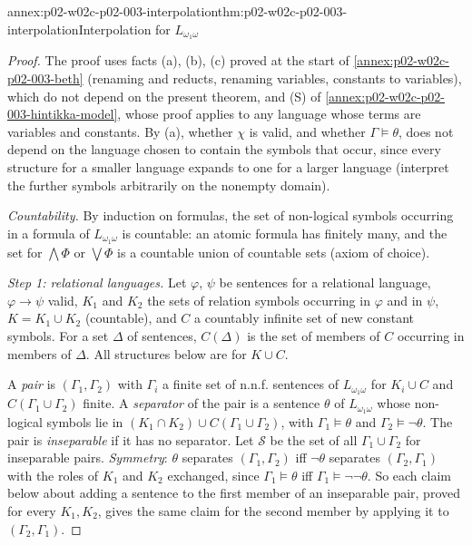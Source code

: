 \begin{annexitem}{annex:p02-w02c-p02-003-interpolation}{thm:p02-w02c-p02-003-interpolation}{Interpolation for \(L_{\omega_1\omega}\)}
\begin{proof}
The proof uses facts (a), (b), (c) proved at the start of
\cref{annex:p02-w02c-p02-003-beth} (renaming and reducts, renaming
variables, constants to variables), which do not depend on the present
theorem, and (S) of \cref{annex:p02-w02c-p02-003-hintikka-model}, whose
proof applies to any language whose terms are variables and constants.
By (a), whether \(\chi\) is valid, and whether \(\Gamma\models\theta\),
does not depend on the language chosen to contain the symbols that occur,
since every structure for a smaller language expands to one for a larger
language (interpret the further symbols arbitrarily on the nonempty
domain).

\emph{Countability.}  By induction on formulas, the set of non-logical
symbols occurring in a formula of \(L_{\omega_1\omega}\) is countable: an
atomic formula has finitely many, and the set for \(\bigwedge\Phi\) or
\(\bigvee\Phi\) is a countable union of countable sets (axiom of choice).

\emph{Step 1: relational languages.}  Let \(\varphi\), \(\psi\) be sentences
for a relational language, \(\varphi\to\psi\) valid, \(K_1\) and \(K_2\)
the sets of relation symbols occurring in \(\varphi\) and in \(\psi\),
\(K=K_1\cup K_2\) (countable), and \(C\) a countably infinite set of new
constant symbols.  For a set \(\Delta\) of sentences, \(C(\Delta)\) is the
set of members of \(C\) occurring in members of \(\Delta\).  All
structures below are for \(K\cup C\).

A \emph{pair} is \((\Gamma_1,\Gamma_2)\) with \(\Gamma_i\) a finite set of
n.n.f. sentences of \(L_{\omega_1\omega}\) for \(K_i\cup C\) and
\(C(\Gamma_1\cup\Gamma_2)\) finite.  A \emph{separator} of the pair is a
sentence \(\theta\) of \(L_{\omega_1\omega}\) whose non-logical symbols lie
in \((K_1\cap K_2)\cup C(\Gamma_1\cup\Gamma_2)\), with
\(\Gamma_1\models\theta\) and \(\Gamma_2\models\neg\theta\).  The pair is
\emph{inseparable} if it has no separator.  Let \(\mathcal S\) be the set
of all \(\Gamma_1\cup\Gamma_2\) for inseparable pairs.  \emph{Symmetry}:
\(\theta\) separates \((\Gamma_1,\Gamma_2)\) iff \(\neg\theta\) separates
\((\Gamma_2,\Gamma_1)\) with the roles of \(K_1\) and \(K_2\) exchanged,
since \(\Gamma_1\models\theta\) iff \(\Gamma_1\models\neg\neg\theta\).  So
each claim below about adding a sentence to the first member of an
inseparable pair, proved for every \(K_1,K_2\), gives the same claim for
the second member by applying it to \((\Gamma_2,\Gamma_1)\).


\end{proof}
\end{annexitem}
